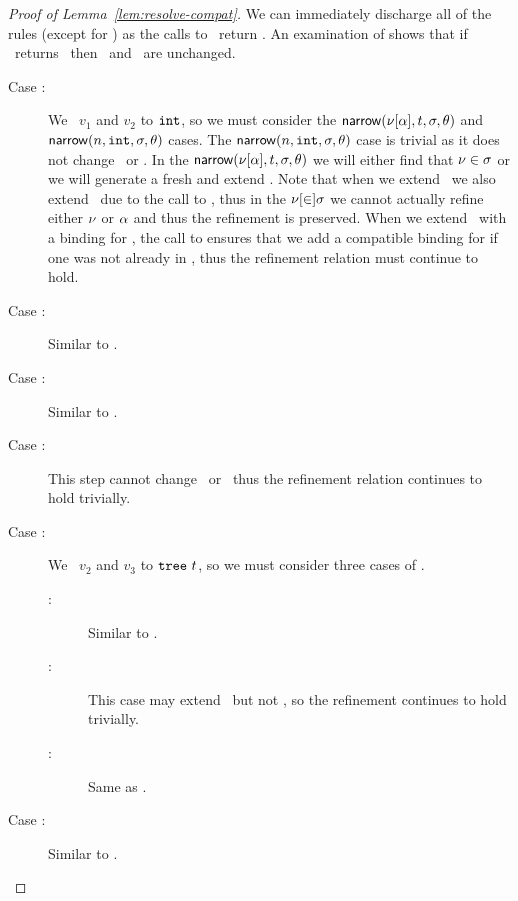 \begin{proof}[Proof of Lemma~\ref{lem:resolve-compat}]
  We can immediately discharge all of the  rules
  (except for \renodebadone) as the calls to \forcesym\ return \stuck.
  An examination of \forcesym shows that if \forcesym\ returns \stuck\
  then \vsu\ and \tsu\ are unchanged.
  \begin{description}
  \item[Case \replusgood:]
    We \forcesym\ $v_1$ and $v_2$ to $\mathtt{int}$, so we must consider
    the $\mathsf{narrow}(\nu[\alpha], t, \sigma, \theta)$ and
    $\mathsf{narrow}(n, \mathtt{int}, \sigma, \theta)$ cases.
    The $\mathsf{narrow}(n, \mathtt{int}, \sigma, \theta)$ case is trivial as it does
    not change \vsu\ or \tsu.
    In the $\mathsf{narrow}(\nu[\alpha], t, \sigma, \theta)$ we will either
    find that $\nu \in \sigma$ or we will generate a fresh \tint
    and extend \vsu.
    Note that when we extend \vsu\ we also extend \tsu\ due to the
    call to \unifysym, thus in the $\nu[\in] \sigma$ we cannot
    actually refine either $\nu$ or $\alpha$ and thus the
    refinement is preserved.
    When we extend \vsu\ with a binding for \ehole, the call to
    \unifysym ensures that we add a compatible binding for
    \thole if one was not already in \tsu, thus the refinement
    relation must continue to hold.
  \item[Case :]
    Similar to \replusgood.
  \item[Case \reappgood:]
    Similar to \replusgood.
  \item[Case \releafgood:]
    This step cannot change \vsu\ or \tsu\ thus the refinement
    relation continues to hold trivially.
  \item[Case \renodegood:]
    We \forcesym\ $v_2$ and $v_3$ to $\mathtt{tree}\ t$, so we must consider
    three cases of \forcesym.
    \begin{description}
    \item[:]
      Similar to \replusgood.
    \item[:]
      This case may extend \tsu\ but not \vsu, so the refinement
      continues to hold trivially.
    \item[:]
      Same as .
    \end{description}
  \item[Case :]
    Similar to \replusgood.
  \end{description}
\end{proof}


